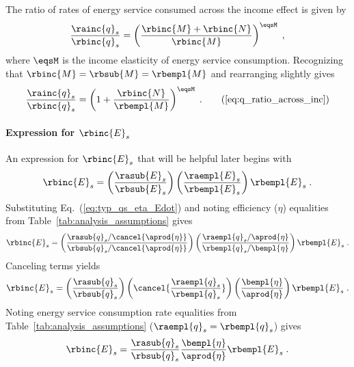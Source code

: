 The ratio of rates of energy service consumed across the income effect is given by
%
\begin{equation}
  \frac{\rainc{q}_s}{\rbinc{q}_s} = \left( \frac{\rbinc{M} + \rbinc{N}}{\rbinc{M}} \right) ^ {\eqsM} \; ,
\end{equation}
%
where $\eqsM$ is the income elasticity of energy service consumption.
Recognizing that $\rbinc{M} = \rbsub{M} = \rbempl{M}$ and rearranging slightly gives
%
\begin{equation}
  \frac{\rainc{q}_s}{\rbinc{q}_s} = \left( 1 + \frac{\rbinc{N}}{\rbempl{M}} \right) ^ {\eqsM} \; . 
                                                                                \tag{\ref{eq:q_ratio_across_inc}}
\end{equation}


\paragraph{Expression for $\rbinc{E}_s$} 
\label{sec:E_dot_s_hat_expression}

An expression for $\rbinc{E}_s$ that will be helpful later
begins with
%
\begin{equation}
  \rbinc{E}_s = \left( \frac{\rasub{E}_s}{\rbsub{E}_s} \right)
                \left( \frac{\raempl{E}_s}{\rbempl{E}_s} \right)
                \rbempl{E}_s \; .
\end{equation}
%
Substituting Eq.~(\ref{eq:typ_qs_eta_Edot}) and noting efficiency ($\eta$)
equalities from Table~\ref{tab:analysis_assumptions} gives
%
\begin{equation}
  \rbinc{E}_s = \left( \frac{\rasub{q}_s / \cancel{\aprod{\eta}}}{\rbsub{q}_s / \cancel{\aprod{\eta}}} \right)
                \left( \frac{\raempl{q}_s / \aprod{\eta}}{\rbempl{q}_s / \bempl{\eta}} \right)
                \rbempl{E}_s \; .
\end{equation}
%
Canceling terms yields
%
\begin{equation}
  \rbinc{E}_s = \left( \frac{\rasub{q}_s}{\rbsub{q}_s} \right)
                \left( \cancel{\frac{\raempl{q}_s}{\rbempl{q}_s}} \right)
                \left( \frac{\bempl{\eta}}{\aprod{\eta}}  \right)
                \rbempl{E}_s \; .
\end{equation}
%
Noting energy service consumption rate equalities from Table~\ref{tab:analysis_assumptions} 
($\raempl{q}_s = \rbempl{q}_s$) gives
%
\begin{equation} \label{eq:E_dot_s_hat}
  \rbinc{E}_s = \frac{\rasub{q}_s}{\rbsub{q}_s}
                \frac{\bempl{\eta}}{\aprod{\eta}}
                \rbempl{E}_s \; .
\end{equation}

